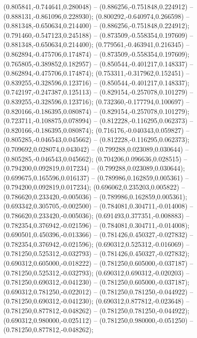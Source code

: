  (0.805841,-0.744641,0.280048) -- (0.886256,-0.751848,0.224912) -- (0.888131,-0.861096,0.228930);
 (0.800292,-0.640974,0.266598) -- (0.881348,-0.650634,0.214400) -- (0.886256,-0.751848,0.224912);
 (0.791460,-0.547123,0.245188) -- (0.873509,-0.558354,0.197609) -- (0.881348,-0.650634,0.214400);
 (0.779561,-0.463941,0.216345) -- (0.862894,-0.475706,0.174874) -- (0.873509,-0.558354,0.197609);
 (0.765805,-0.389852,0.182957) -- (0.850544,-0.401217,0.148337) -- (0.862894,-0.475706,0.174874);
 (0.753311,-0.317962,0.152451) -- (0.839255,-0.328596,0.123716) -- (0.850544,-0.401217,0.148337);
 (0.742197,-0.247387,0.125113) -- (0.829154,-0.257078,0.101279) -- (0.839255,-0.328596,0.123716);
 (0.732360,-0.177794,0.100697) -- (0.820166,-0.186395,0.080874) -- (0.829154,-0.257078,0.101279);
 (0.723711,-0.108875,0.078994) -- (0.812228,-0.116295,0.062373) -- (0.820166,-0.186395,0.080874);
 (0.716176,-0.040343,0.059827) -- (0.805285,-0.046543,0.045662) -- (0.812228,-0.116295,0.062373);
 (0.709692,0.028074,0.043042) -- (0.799288,0.023089,0.030644) -- (0.805285,-0.046543,0.045662);
 (0.704206,0.096636,0.028515) -- (0.794200,0.092819,0.017234) -- (0.799288,0.023089,0.030644);
 (0.699675,0.165596,0.016137) -- (0.789986,0.162859,0.005361) -- (0.794200,0.092819,0.017234);
 (0.696062,0.235203,0.005822) -- (0.786620,0.233420,-0.005036) -- (0.789986,0.162859,0.005361);
 (0.693342,0.305705,-0.002500) -- (0.784081,0.304711,-0.014008) -- (0.786620,0.233420,-0.005036);
 (0.691493,0.377351,-0.008883) -- (0.782354,0.376942,-0.021596) -- (0.784081,0.304711,-0.014008);
 (0.690501,0.450396,-0.013366) -- (0.781426,0.450327,-0.027832) -- (0.782354,0.376942,-0.021596);
 (0.690312,0.525312,-0.016069) -- (0.781250,0.525312,-0.032793) -- (0.781426,0.450327,-0.027832);
 (0.690312,0.605000,-0.018222) -- (0.781250,0.605000,-0.037187) -- (0.781250,0.525312,-0.032793);
 (0.690312,0.690312,-0.020203) -- (0.781250,0.690312,-0.041230) -- (0.781250,0.605000,-0.037187);
 (0.690312,0.781250,-0.022012) -- (0.781250,0.781250,-0.044922) -- (0.781250,0.690312,-0.041230);
 (0.690312,0.877812,-0.023648) -- (0.781250,0.877812,-0.048262) -- (0.781250,0.781250,-0.044922);
 (0.690312,0.980000,-0.025112) -- (0.781250,0.980000,-0.051250) -- (0.781250,0.877812,-0.048262);
